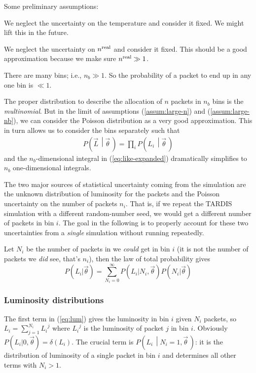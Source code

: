 \documentclass[a4,12pt]{article}
\newcommand{\given}[2]{\left(#1\, \middle| #2 \, \right)}
\newcommand{\Lumi}{\ensuremath{L_i}}
\newcommand{\real}{\ensuremath{{\rm real}}}
\newcommand{\vecL}{\ensuremath{\vec{L}}}
\newcommand{\vecth}{\ensuremath{{\vec{\theta}}}}
\def \refeq#1{(\ref{eq:#1})}
\newcommand{\tardis}{TARDIS}
\begin{document}
Some preliminary assumptions:
\begin{compactenum}[(a)]
  \item We neglect the uncertainty on the temperature and consider it
    fixed. We might lift this in the future.
  \item \label{assum:large-n} We neglect the uncertainty on $n^\real$ and consider it
    fixed. This should be a good approximation because we make sure
    $n^\real \gg 1$.
  \item \label{assum:large-nb} There are many bins; i.e., $n_b \gg 1$. So the probability of
    a packet to end up in any one bin is $\ll 1$.
\end{compactenum}
The proper distribution to describe the allocation of $n$ packets in
$n_b$ bins is the \emph{multinomial}. But in the limit of assumptions
(\ref{assum:large-n}) and (\ref{assum:large-nb}), we can consider the
Poisson distribution as a very good approximation. This in turn allows
us to consider the bins separately such that
\begin{align}
  \label{eq:factor-L}
  P\given{\vecL}{\vecth} = \prod_i P\given{L_i}{\vecth}
\end{align}
and the $n_b$-dimensional integral in \refeq{like-expanded}
dramatically simplifies to $n_b$ one-dimensional integrals.

The two major sources of statistical uncertainty coming from the
simulation are the unknown distribution of luminosity for the packets
and the Poisson uncertainty on the number of packets $n_i$. That is,
if we repeat the \tardis{} simulation with a different random-number
seed, we would get a different number of packets in bin $i$. The goal
in the following is to properly account for these two uncertainties
from a \emph{single} simulation without running repeatedly.

Let $N_i$ be the number of packets in we \emph{could} get in bin $i$
(it is not the number of packets we \emph{did} see, that's $n_i$),
then the law of total probability gives
\begin{equation}
  \label{eq:lum}
  P(\Lumi | \vecth) = \sum_{N_i=0}^{\infty} P(\Lumi | N_i, \vecth) P(N_i | \vecth)
\end{equation}

\subsubsection{Luminosity distributions}

The first term in \refeq{lum} gives the luminosity in bin $i$ given
$N_i$ packets, so $\Lumi = \sum_{j=1}^{N_i} \Lumi^j$ where $\Lumi^j$
is the luminosity of packet $j$ in bin $i$. Obviously $P(\Lumi | 0,
\vecth) = \delta(\Lumi)$. The crucial term is
$P\given{L_i}{N_i=1,\vecth}$: it is the distribution of luminosity of
a single packet in bin $i$ and determines all other terms with
$N_i>1$.
\end{document}

